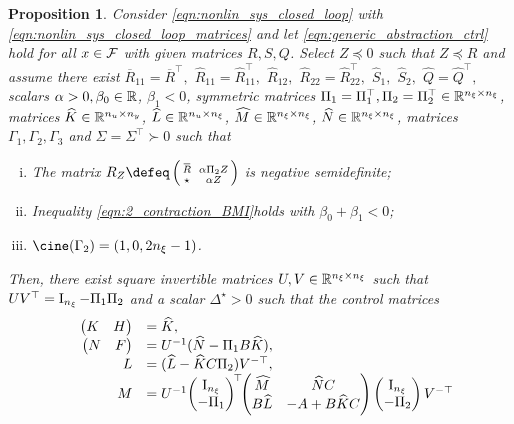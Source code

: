 \documentclass{ifacconf}
\newtheorem{proposition}{Proposition}
\begin{document}
\begin{proposition}
    \label{prp:2_contr_BMI}
     Consider  \eqref{eqn:nonlin_sys_closed_loop} with \eqref{eqn:nonlin_sys_closed_loop_matrices} %
and let \eqref{eqn:generic_abstraction_ctrl} hold for all  $x\in{\mathcal{F}}$  with given matrices $R, S, Q$. Select $Z\preceq 0$ such that $Z\preceq R$ and assume there exist $ \overbar R_{11}=\overbar R^\top,$ $ \widehat R_{11}=\widehat R_{11}^\top,$ $ \widehat R_{12},$ $ \widehat R_{22}=\widehat R_{22}^\top,$ $ \widehat S_1,$ $ \widehat S_2,$ $ \widehat Q=\widehat Q^\top,$ scalars $\alpha>0,\beta_0\in{\mathbb{R}}$, $\beta_1<0$,  symmetric matrices $\Pi_1=\Pi_1^\top, \Pi_2=\Pi_2^\top \in {\mathbb{R}}^{n_\xi\times n_\xi}$, matrices $\widehat K \in {\mathbb{R}}^{n_u\times n_y}$, $\widehat L\in {\mathbb{R}}^{n_u\times n_\xi}$, $\widehat M\in {\mathbb{R}}^{n_\xi\times n_\xi}$, $\widehat N \in {\mathbb{R}}^{n_\xi\times n_\xi}$,  matrices $\Gamma_1, \Gamma_2, \Gamma_3$  and $\Sigma=\Sigma^\top\succ 0$  such that 
\begin{enumerate}[i)]
        \item The matrix $ R_Z \defeq \smallpmat{\overbar R && \alpha \Pi_2Z\\ \star && \alpha Z}$ is negative semidefinite;
         \item Inequality \eqref{eqn:2_contraction_BMI}\footnotemark[1] holds with $\beta_0+\beta_1<0$;
        \item $\cine(\Gamma_2)=(1, 0, 2n_\xi-1)$.
    \end{enumerate}
     Then, 
     there exist square invertible matrices $U,V\in {\mathbb{R}}^{n_\xi\times n_\xi}$ such that $UV^\top = \operatorname{I}_{n_\xi}- \Pi_1\Pi_2$
    and a scalar $\Delta^\star>0$ such that the control matrices 
    \begin{equation}
    \label{eqn:ctrl_matrices}
    \begin{array}{rl}
          \pmx{K & H}&= \widehat K,  \\
         \pmx{N& F}&= U^{-1} (\widehat N - \Pi_1 B \widehat K) ,\\
           L & = (\widehat L - \widehat K C \Pi_2) V^{-\top},\\
         M&=U^{-1}\!\pmx{\Id_{n_\xi}\\-\Pi_1}^{\!\top}\!\!\pmx{\widehat M & \widehat N C\\
         B \widehat L & -A+ B\widehat  KC}\pmx{\Id_{n_\xi}\\-\Pi_2}V^{-\top}\!\!\!\!\!\!
    \end{array}
\end{equation}

\end{proposition}
\end{document}
